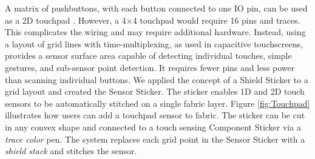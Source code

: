 \documentclass[header.tex]{subfiles}
\begin{document}





A matrix of pushbuttons, with each button connected to one IO pin, can be used as a 2D touchpad \cite{hamdan2016grabrics,5387040}. 
However, a 4$\times$4 touchpad would require 16 pins and traces. This complicates the wiring and may require additional hardware. Instead, using a layout of grid lines with time-multiplexing, as used in capacitive touchscreens, provides a sensor surface area capable of detecting individual touches, simple gestures, and sub-sensor point detection. It requires fewer pins 
and less power than scanning individual buttons. 
We applied the concept of a Shield Sticker to a grid layout and created the Sensor Sticker. The sticker enables 1D and 2D touch sensors to be automatically stitched on a single fabric layer. Figure \ref{fig:Touchpad} illustrates how users can add a touchpad sensor to fabric. The sticker can be cut in any convex shape and connected to a touch sensing Component Sticker via a \textit{trace color} pen. %
The system replaces each grid point in the Sensor Sticker with a \textit{shield stack} and stitches the sensor. 
\end{document}

